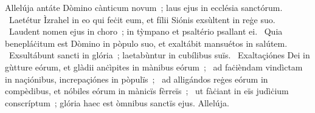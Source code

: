 { Allelúja}
{%
antáte Dòmino cànticum novum~; laus ejus in ecclésia sanctórum. 
~Laetétur Ìzrahel in eo qui feċit eum, et fílii Siónis exsùltent in reġe suo. 
~Laudent nomen ejus in choro~; in tỳmpano et psaltério psallant ei. 
~Quia benepláċitum est Dòmino in pòpulo suo, et exaltábit mansuétos in salútem. 
~Exsultábunt sancti in glória~; laetabùntur in cubílibus suïs. 
~Exaltaçiónes Dei in gùtture eórum, et glàdii anċìpites in mànibus eórum~; 
~ad faċièndam vindìctam in naçiónibus, increpaçiónes in pòpulïs~; 
~ad alligándos reġes eórum in compèdibus, et nóbiles eórum in mànicïs fèrreïs~; 
~ut fàċiant in eïs judìċium conscríptum~; glória haec est òmnibus sanctïs ejus. Allelúja. 
}
